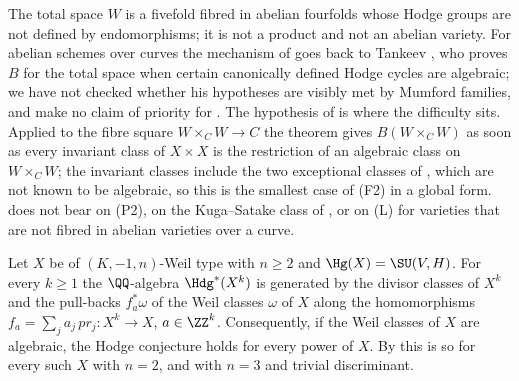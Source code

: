 \begin{remark}\label{rem:newlefschetzscope}
The total space $W$ is a fivefold fibred in abelian fourfolds whose Hodge
groups are not defined by endomorphisms; it is not a product and not an
abelian variety. For abelian schemes over curves the mechanism of
 goes back to Tankeev \cite{Tan03}, who proves $B$
for the total space when certain canonically defined Hodge cycles are
algebraic; we have not checked whether his hypotheses are visibly met by
Mumford families, and make no claim of priority for
. The
hypothesis of  is where the difficulty sits.
Applied to the fibre square $W\times_{C}W\to C$ the theorem gives
$B(W\times_{C}W)$ as soon as every invariant class of $X\times X$ is the
restriction of an algebraic class on $W\times_{C}W$; the invariant classes
include the two exceptional classes of , which are
not known to be algebraic, so this is the smallest case of (F2) in a global
form.  does not bear on (P2), on the Kuga--Satake
class of , or on \textup{(L)} for varieties that are not
fibred in abelian varieties over a curve.
\end{remark}

\begin{proposition}\label{prop:powers}
Let $X$ be of $(K,-1,n)$-Weil type with $n\ge2$ and $\Hg(X)=\SU(V,H)$. For
every $k\ge1$ the $\QQ$-algebra $\Hdg^{*}(X^{k})$ is generated by the divisor
classes of $X^{k}$ and the pull-backs $f_{a}^{*}\omega$ of the Weil classes
$\omega$ of $X$ along the homomorphisms $f_{a}=\sum_{j}a_{j}\,pr_{j}\colon
X^{k}\to X$, $a\in\ZZ^{k}$. Consequently, if the Weil classes of $X$ are
algebraic, the Hodge conjecture holds for every power of $X$. By
\cite{Mar25a} this is so for every such $X$ with $n=2$, and with $n=3$ and
trivial discriminant.
\end{proposition}

